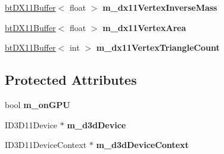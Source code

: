 \begin{DoxyCompactItemize}
\item 
\hypertarget{classbt_soft_body_vertex_data_d_x11_a9b0cc3ef89ebcdbbbbb261ca96644554}{\hyperlink{classbt_d_x11_buffer}{bt\+D\+X11\+Buffer}$<$ float $>$ {\bfseries m\+\_\+dx11\+Vertex\+Inverse\+Mass}}\label{classbt_soft_body_vertex_data_d_x11_a9b0cc3ef89ebcdbbbbb261ca96644554}

\item 
\hypertarget{classbt_soft_body_vertex_data_d_x11_a72fc2b21bc500886c9c98c4c0325cf44}{\hyperlink{classbt_d_x11_buffer}{bt\+D\+X11\+Buffer}$<$ float $>$ {\bfseries m\+\_\+dx11\+Vertex\+Area}}\label{classbt_soft_body_vertex_data_d_x11_a72fc2b21bc500886c9c98c4c0325cf44}

\item 
\hypertarget{classbt_soft_body_vertex_data_d_x11_aadc2c76edf778389b942c9f9f56916da}{\hyperlink{classbt_d_x11_buffer}{bt\+D\+X11\+Buffer}$<$ int $>$ {\bfseries m\+\_\+dx11\+Vertex\+Triangle\+Count}}\label{classbt_soft_body_vertex_data_d_x11_aadc2c76edf778389b942c9f9f56916da}

\end{DoxyCompactItemize}
\subsection*{Protected Attributes}
\begin{DoxyCompactItemize}
\item 
\hypertarget{classbt_soft_body_vertex_data_d_x11_abb25699f7147c3fe273ec2bbc7e187bf}{bool {\bfseries m\+\_\+on\+G\+P\+U}}\label{classbt_soft_body_vertex_data_d_x11_abb25699f7147c3fe273ec2bbc7e187bf}

\item 
\hypertarget{classbt_soft_body_vertex_data_d_x11_a12bf9ad10e3af88f92fe27cc9169c2b3}{I\+D3\+D11\+Device $\ast$ {\bfseries m\+\_\+d3d\+Device}}\label{classbt_soft_body_vertex_data_d_x11_a12bf9ad10e3af88f92fe27cc9169c2b3}

\item 
\hypertarget{classbt_soft_body_vertex_data_d_x11_a7cf359f5d3e1f10fafddff75eac5b496}{I\+D3\+D11\+Device\+Context $\ast$ {\bfseries m\+\_\+d3d\+Device\+Context}}\label{classbt_soft_body_vertex_data_d_x11_a7cf359f5d3e1f10fafddff75eac5b496}

\end{DoxyCompactItemize}


